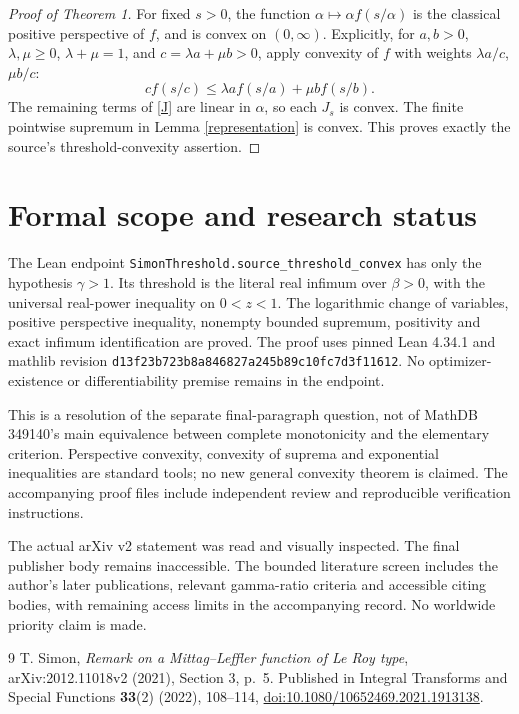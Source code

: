 \documentclass[11pt]{article}
\begin{document}
\begin{proof}[Proof of Theorem 1]
For fixed $s>0$, the function $\alpha\mapsto\alpha f(s/\alpha)$ is the classical positive perspective of $f$, and is convex on $(0,\infty)$. Explicitly, for $a,b>0$, $\lambda,\mu\geq0$, $\lambda+\mu=1$, and $c=\lambda a+\mu b>0$, apply convexity of $f$ with weights $\lambda a/c$, $\mu b/c$:
\[
 c f(s/c)\leq\lambda a f(s/a)+\mu b f(s/b).
\]
The remaining terms of \eqref{J} are linear in $\alpha$, so each $J_s$ is convex. The finite pointwise supremum in Lemma \ref{representation} is convex. This proves exactly the source's threshold-convexity assertion.
\end{proof}

\section*{Formal scope and research status}
The Lean endpoint \texttt{SimonThreshold.source\_threshold\_convex} has only the hypothesis $\gamma>1$. Its threshold is the literal real infimum over $\beta>0$, with the universal real-power inequality on $0<z<1$. The logarithmic change of variables, positive perspective inequality, nonempty bounded supremum, positivity and exact infimum identification are proved. The proof uses pinned Lean 4.34.1 and mathlib revision \texttt{d13f23b723b8a846827a245b89c10fc7d3f11612}. No optimizer-existence or differentiability premise remains in the endpoint.

This is a resolution of the separate final-paragraph question, not of MathDB 349140's main equivalence between complete monotonicity and the elementary criterion. Perspective convexity, convexity of suprema and exponential inequalities are standard tools; no new general convexity theorem is claimed. The accompanying proof files include independent review and reproducible verification instructions.

The actual arXiv v2 statement was read and visually inspected. The final publisher body remains inaccessible. The bounded literature screen includes the author's later publications, relevant gamma-ratio criteria and accessible citing bodies, with remaining access limits in the accompanying record. No worldwide priority claim is made.

\begin{thebibliography}{9}
 T. Simon, \emph{Remark on a Mittag--Leffler function of Le Roy type}, arXiv:2012.11018v2 (2021), Section 3, p.~5. Published in Integral Transforms and Special Functions \textbf{33}(2) (2022), 108--114, \href{https://doi.org/10.1080/10652469.2021.1913138}{doi:10.1080/10652469.2021.1913138}.
\end{thebibliography}
\end{document}
